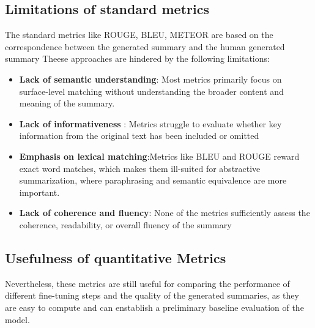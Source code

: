 \documentclass[11pt,a4paper]{article}
\begin{document}
\subsection{Limitations of standard metrics}
The standard metrics like ROUGE, BLEU, METEOR are based on the correspondence between the generated summary and the human generated summary
Theese approaches are hindered by the following limitations:
\raggedright
\begin{itemize}
    \item \textbf{Lack of semantic understanding}: Most metrics primarily focus on surface-level matching without understanding the broader content and meaning of the summary.
    \item \textbf{Lack of informativeness }: Metrics struggle to evaluate whether key information from the original text has been included or omitted
    \item \textbf{Emphasis on lexical matching}:Metrics like BLEU and ROUGE reward exact word matches, which makes them ill-suited for abstractive summarization, where paraphrasing and semantic equivalence are more important.
    \item \textbf{Lack of coherence and fluency}: None of the metrics sufficiently assess the coherence, readability, or overall fluency of the summary
\end{itemize}
\subsection{Usefulness of quantitative Metrics}
Nevertheless, these metrics are still useful for comparing the performance of different fine-tuning steps
 and the quality of the generated summaries,
as they are easy to compute and can enstablish a preliminary baseline evaluation of the model.
\end{document}
